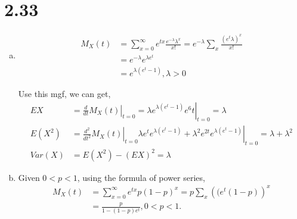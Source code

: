 \documentclass[letter]{article}
\newcommand{\mgf}{M_X(t)}
\begin{document}
    \section*{2.33}
    \begin{enumerate}[(a)]
    \item \begin{align*}
    \mgf & = \sum_{x=0}^\infty e^{tx} \frac{e^{-\lambda}\lambda^x}{x!}
    = e^{-\lambda} \sum_x \frac{(e^t\lambda)^x}{x!} \\
    & = e^{-\lambda} e^{\lambda e^t} \\
    & = e^{\lambda(e^t-1)}, \lambda > 0
    \end{align*}

    Use this mgf, we can get,
    \begin{align*}
    EX & = \left. \frac{d}{dt} \mgf\right|_{t=0} = \left. \lambda e^{\lambda(e^t-1)}e^6t\right|_{t=0} = \lambda \\
    E(X^2) & = \left. \frac{d^2}{dt^2} \mgf\right|_{t=0} \lambda e^t e^{\lambda(e^t-1)} +
    \left. \lambda^2 e^{2t} e^{\lambda(e^t-1)}\right|_{t=0} = \lambda + \lambda^2 \\
    Var(X) & = E(X^2) - (EX)^2 = \lambda
    \end{align*}
    \item 
    Given $0 < p < 1$, using the formula of power series,
    \begin{align*}
    \mgf & = \sum_{x=0}^\infty e^{tx}p(1-p)^x = p \sum_x
    \left((e^t(1-p)\right)^x \\
    & = \frac{p}{1-(1-p)e^t}, 0 < p < 1.
    \end{align*}


\end{enumerate}
\end{document}
